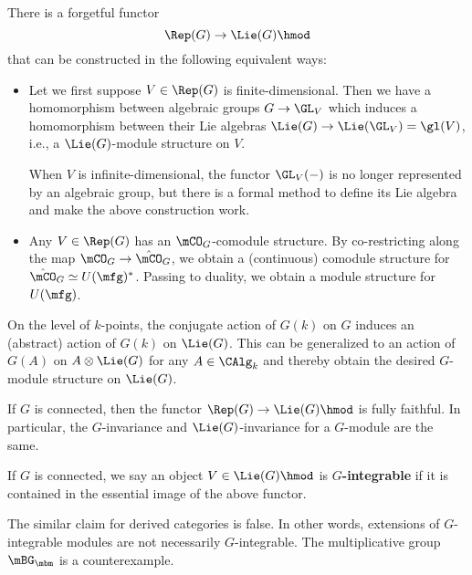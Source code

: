 \begin{constr}
	There is a forgetful functor
	\[
		\Rep(G) \to \Lie(G)\hmod
	\]
	that can be constructed in the following equivalent ways:

	\begin{itemize}
		\item 
			Let we first suppose $V\in \Rep(G)$ is finite-dimensional. Then we have a homomorphism between algebraic groups $G\to \GL_V$ which induces a homomorphism between their Lie algebras $\Lie(G) \to \Lie(\GL_V) =\gl(V)$, i.e., a $\Lie(G)$-module structure on $V$.

			When $V$ is infinite-dimensional, the functor $\GL_V(-)$ is no longer represented by an algebraic group, but there is a formal method to define its Lie algebra and make the above construction work.
		\item
			Any $V\in \Rep(G)$ has an $\mCO_G$-comodule structure. By co-restricting along the map $\mCO_G \to \hat\mCO_G$, we obtain a (continuous) comodule structure for $\hat\mCO_G\simeq U(\mfg)^*$. Passing to duality, we obtain a module structure for $U(\mfg)$.

	\end{itemize}
\end{constr}


\begin{rem}
	On the level of $k$-points, the conjugate action of $G(k)$ on $G$ induces an (abstract) action of $G(k)$ on $\Lie(G)$. This can be generalized to an action of $G(A)$ on $A\ot\Lie(G)$ for any $A\in \CAlg_k$ and thereby obtain the desired $G$-module structure on $\Lie(G)$.
\end{rem}

\begin{prop}
	If $G$ is connected, then the functor $\Rep(G) \to \Lie(G)\hmod$ is fully faithful. In particular, the $G$-invariance and $\Lie(G)$-invariance for a $G$-module are the same. 
\end{prop}

\begin{defn}
	If $G$ is connected, we say an object $V\in \Lie(G)\hmod$ is \textbf{$G$-integrable} if it is contained in the essential image of the above functor.
\end{defn}

\begin{warn}
	The similar claim for derived categories is false. In other words, extensions of $G$-integrable modules are not necessarily $G$-integrable. The multiplicative group $\mBG_\mbm$ is a counterexample.
\end{warn}

